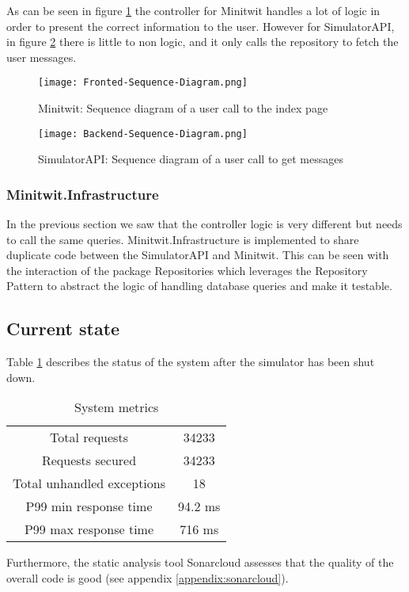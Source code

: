 As can be seen in figure \ref{fig:frontend-interaction} the controller for Minitwit handles a lot of logic in order to present the correct information to the user. However for SimulatorAPI, in figure \ref{fig:backend-interaction} there is little to non logic, and it only calls the repository to fetch the user messages.
\begin{figure}[H]
    \begin{center}
        \texttt{[image: Fronted-Sequence-Diagram.png]}
    \end{center}
    \caption{Minitwit: Sequence diagram of a user call to the index page}
    \label{fig:frontend-interaction}
\end{figure}
\begin{figure}[H]
    \begin{center}
        \texttt{[image: Backend-Sequence-Diagram.png]}
    \end{center}
    \caption{SimulatorAPI: Sequence diagram of a user call to get messages}
    \label{fig:backend-interaction}
\end{figure}
\subsubsection{Minitwit.Infrastructure}
In the previous section we saw that the controller logic is very different but needs to call the same queries.
Minitwit.Infrastructure is implemented to share duplicate code between the SimulatorAPI and Minitwit. This can be seen with the interaction of the package Repositories which leverages the Repository Pattern to abstract the logic of handling database queries and make it testable.


\subsection{Current state}
Table \ref{current-table} describes the status of the system after the simulator has been shut down.
\begin{table}[H]
    \begin{center}
        \begin{tabular}{ |c|c| }
            \hline
            Total requests & 34233 \\
            Requests secured & 34233 \\
            Total unhandled exceptions & 18 \\
            P99 min response time & 94.2 ms \\
            P99 max response time & 716 ms \\
            \hline
        \end{tabular}
    \end{center}
    \caption{System metrics}
    \label{current-table}
\end{table}
Furthermore, the static analysis tool Sonarcloud assesses that the quality of the overall code is good (see appendix \ref{appendix:sonarcloud}).
